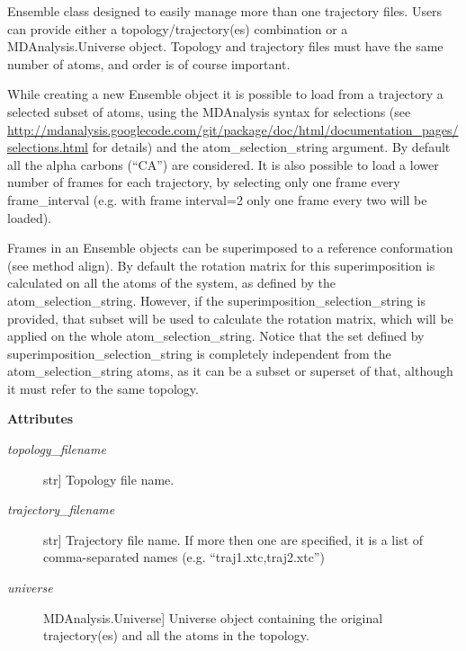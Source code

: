 \documentclass[letterpaper,10pt,english]{sphinxmanual}
\begin{document}
\begin{fulllineitems}
\label{index:encore.Ensemble.Ensemble}
Ensemble class designed to easily manage more than one trajectory files. Users can provide either a topology/trajectory(es) combination or a MDAnalysis.Universe object. Topology and trajectory files must have the same number of atoms, and order is of course important.

While creating a new Ensemble object it is possible to load from a trajectory a selected subset of atoms, using the MDAnalysis syntax for selections (see \href{http://mdanalysis.googlecode.com/git/package/doc/html/documentation\_pages/selections.html}{http://mdanalysis.googlecode.com/git/package/doc/html/documentation\_pages/selections.html} for details) and the atom\_selection\_string argument. By default all the alpha carbons (``CA'') are considered. It is also possible to load a lower number of frames for each trajectory, by selecting only one frame every frame\_interval (e.g. with frame interval=2 only one frame every two will be loaded).

Frames in an Ensemble objects can be superimposed to a reference conformation (see method align). By default the rotation matrix for this superimposition is calculated on all the atoms of the system, as defined by the atom\_selection\_string. However, if the superimposition\_selection\_string is provided, that subset will be used to calculate the rotation matrix, which will be applied on the whole atom\_selection\_string. Notice that the set defined by superimposition\_selection\_string is completely independent from the atom\_selection\_string atoms, as it can be a subset or superset of that, although it must refer to the same topology.

\textbf{Attributes}
\begin{description}
\item[{\emph{topology\_filename}}] \leavevmode{[}str{]}
Topology file name.

\item[{\emph{trajectory\_filename}}] \leavevmode{[}str{]}
Trajectory file name. If more then one are specified, it is a list of comma-separated names (e.g. ``traj1.xtc,traj2.xtc'')

\item[{\emph{universe}}] \leavevmode{[}MDAnalysis.Universe{]}
Universe object containing the original trajectory(es) and all the atoms in the topology.


\end{description}
\end{fulllineitems}
\end{document}
